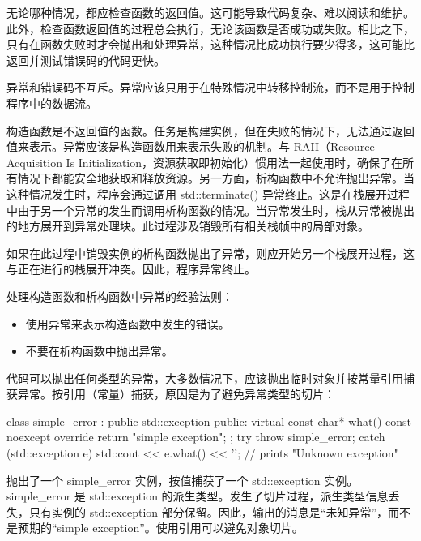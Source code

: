 无论哪种情况，都应检查函数的返回值。这可能导致代码复杂、难以阅读和维护。此外，检查函数返回值的过程总会执行，无论该函数是否成功或失败。相比之下，只有在函数失败时才会抛出和处理异常，这种情况比成功执行要少得多，这可能比返回并测试错误码的代码更快。

\begin{myTip}
异常和错误码不互斥。异常应该只用于在特殊情况中转移控制流，而不是用于控制程序中的数据流。
\end{myTip}

构造函数是不返回值的函数。任务是构建实例，但在失败的情况下，无法通过返回值来表示。异常应该是构造函数用来表示失败的机制。与 RAII（Resource Acquisition Is Initialization，资源获取即初始化）惯用法一起使用时，确保了在所有情况下都能安全地获取和释放资源。另一方面，析构函数中不允许抛出异常。当这种情况发生时，程序会通过调用 std::terminate() 异常终止。这是在栈展开过程中由于另一个异常的发生而调用析构函数的情况。当异常发生时，栈从异常被抛出的地方展开到异常处理块。此过程涉及销毁所有相关栈帧中的局部对象。

如果在此过程中销毁实例的析构函数抛出了异常，则应开始另一个栈展开过程，这与正在进行的栈展开冲突。因此，程序异常终止。

\begin{myTip}
处理构造函数和析构函数中异常的经验法则：

\begin{itemize}
\item
使用异常来表示构造函数中发生的错误。

\item
不要在析构函数中抛出异常。
\end{itemize}
\end{myTip}

代码可以抛出任何类型的异常，大多数情况下，应该抛出临时对象并按常量引用捕获异常。按引用（常量）捕获，原因是为了避免异常类型的切片：

\begin{cpp}
class simple_error : public std::exception
{
public:
    virtual const char* what() const noexcept override
    {
        return "simple exception";
    }
};
try
{
    throw simple_error{};
}
catch (std::exception e)
{
    std::cout << e.what() << '\n'; // prints "Unknown exception"
}
\end{cpp}

抛出了一个 simple\_error 实例，按值捕获了一个 std::exception 实例。simple\_error 是 std::exception 的派生类型。发生了切片过程，派生类型信息丢失，只有实例的 std::exception 部分保留。因此，输出的消息是“未知异常”，而不是预期的“simple exception”。使用引用可以避免对象切片。

